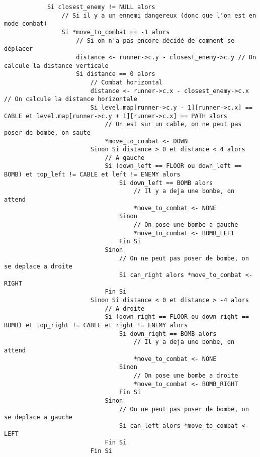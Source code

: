 \begin{longlisting}
\begin{verbatim}
            Si closest_enemy != NULL alors
                // Si il y a un ennemi dangereux (donc que l'on est en mode combat)
                Si *move_to_combat == -1 alors
                    // Si on n'a pas encore décidé de comment se déplacer
                    distance <- runner->c.y - closest_enemy->c.y // On calcule la distance verticale
                    Si distance == 0 alors
                        // Combat horizontal
                        distance <- runner->c.x - closest_enemy->c.x // On calcule la distance horizontale
                        Si level.map[runner->c.y - 1][runner->c.x] == CABLE et level.map[runner->c.y + 1][runner->c.x] == PATH alors
                            // On est sur un cable, on ne peut pas poser de bombe, on saute
                            *move_to_combat <- DOWN
                        Sinon Si distance > 0 et distance < 4 alors
                            // A gauche
                            Si (down_left == FLOOR ou down_left == BOMB) et top_left != CABLE et left != ENEMY alors
                                Si down_left == BOMB alors
                                    // Il y a deja une bombe, on attend
                                    *move_to_combat <- NONE
                                Sinon
                                    // On pose une bombe a gauche
                                    *move_to_combat <- BOMB_LEFT
                                Fin Si
                            Sinon
                                // On ne peut pas poser de bombe, on se deplace a droite
                                Si can_right alors *move_to_combat <- RIGHT
                            Fin Si
                        Sinon Si distance < 0 et distance > -4 alors
                            // A droite
                            Si (down_right == FLOOR ou down_right == BOMB) et top_right != CABLE et right != ENEMY alors
                                Si down_right == BOMB alors
                                    // Il y a deja une bombe, on attend
                                    *move_to_combat <- NONE
                                Sinon
                                    // On pose une bombe a droite
                                    *move_to_combat <- BOMB_RIGHT
                                Fin Si
                            Sinon
                                // On ne peut pas poser de bombe, on se deplace a gauche
                                Si can_left alors *move_to_combat <- LEFT
                            Fin Si
                        Fin Si


\end{verbatim}
\end{longlisting}
